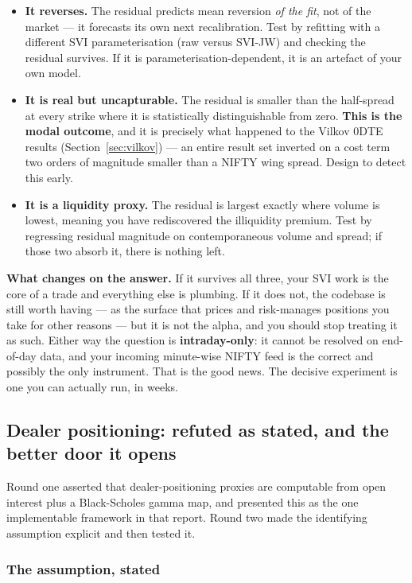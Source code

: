 \documentclass[11pt,a4paper]{article}
\begin{document}
\begin{itemize}
\item \textbf{It reverses.} The residual predicts mean reversion \emph{of the
fit}, not of the market --- it forecasts its own next recalibration. Test by
refitting with a different SVI parameterisation (raw versus SVI-JW) and checking
the residual survives. If it is parameterisation-dependent, it is an artefact of
your own model.
\item \textbf{It is real but uncapturable.} The residual is smaller than the
half-spread at every strike where it is statistically distinguishable from zero.
\textbf{This is the modal outcome}, and it is precisely what happened to the
Vilkov 0DTE results (Section~\ref{sec:vilkov}) --- an entire result set inverted
on a cost term two orders of magnitude smaller than a NIFTY wing spread. Design
to detect this early.
\item \textbf{It is a liquidity proxy.} The residual is largest exactly where
volume is lowest, meaning you have rediscovered the illiquidity premium. Test by
regressing residual magnitude on contemporaneous volume and spread; if those two
absorb it, there is nothing left.
\end{itemize}

\textbf{What changes on the answer.} If it survives all three, your SVI work is
the core of a trade and everything else is plumbing. If it does not, the codebase
is still worth having --- as the surface that prices and risk-manages positions
you take for other reasons --- but it is not the alpha, and you should stop
treating it as such. Either way the question is \textbf{intraday-only}: it cannot
be resolved on end-of-day data, and your incoming minute-wise NIFTY feed is the
correct and possibly the only instrument. That is the good news. The decisive
experiment is one you can actually run, in weeks.

\subsection{Dealer positioning: refuted as stated, and the better door it opens}
\label{sec:gex}

Round one asserted that dealer-positioning proxies are computable from open
interest plus a Black-Scholes gamma map, and presented this as the one
implementable framework in that report. Round two made the identifying assumption
explicit and then tested it.

\subsubsection{The assumption, stated}
\end{document}
